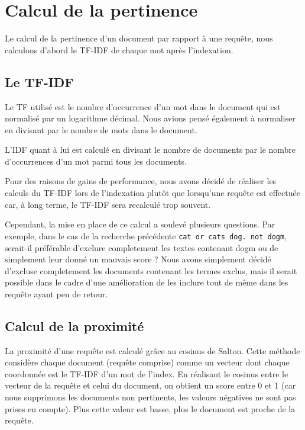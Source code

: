 \documentclass[a4paper,10pt]{report}
\begin{document}
\section{Calcul de la pertinence}

Le calcul de la pertinence d'un document par rapport \`a une requ\^ete, nous calculons d'abord le TF-IDF de chaque mot apr\`es l'indexation.

\subsection{Le TF-IDF}

Le TF utilis\'e est le nombre d'occurrence d'un mot dans le document qui est normalis\'e par un logarithme d\'ecimal. Nous avions pens\'e \'egalement \`a normaliser en divisant par le nombre de mots dans le document.

L'IDF quant \`a lui est calcul\'e en divisant le nombre de documents par le nombre d'occurrences d'un mot parmi tous les documents.

Pour des raisons de gains de performance, nous avons décidé de réaliser les calculs du TF-IDF lors de l'indexation plutôt que lorsqu'une requête est effectuée car, à long terme, le TF-IDF sera recalculé trop souvent.

Cependant, la mise en place de ce calcul a soulevé plusieurs questions. Par exemple, dans le cas de la recherche précédente \texttt{cat or cats dog. not dogm}, serait-il préférable d'exclure completement les textes contenant dogm ou de simplement leur donné un mauvais score ? Nous avons simplement décidé d'excluse completement les documents contenant les termes exclus, mais il serait possible dans le cadre d'une amélioration de les inclure tout de même dans les requête ayant peu de retour.

\subsection{Calcul de la proximit\'e}

La proximit\'e d'une requ\^ete est calcul\'e gr\^ace au cosinus de Salton. Cette m\'ethode consid\`ere chaque document (requ\^ete comprise) comme un vecteur dont chaque coordonn\'ee est le TF-IDF d'un mot de l'index. En r\'ealisant le cosinus entre le vecteur de la requ\^ete et celui du document, on obtient un score entre 0 et 1 (car nous supprimons les documents non pertinents, les valeurs n\'egatives ne sont pas prises en compte). Plus cette valeur est basse, plus le document est proche de la requ\^ete.
\end{document}
